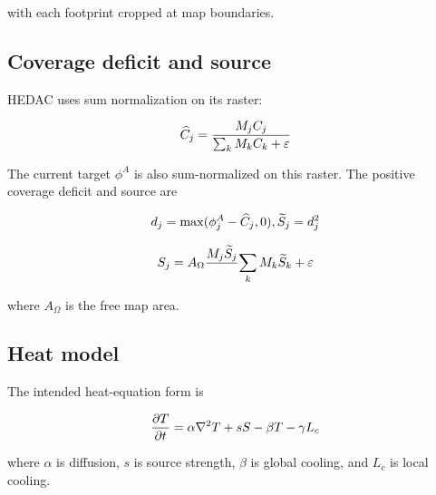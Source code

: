 \documentclass[11pt]{article}
\begin{document}
with each footprint cropped at map boundaries.


\subsection{Coverage deficit and source}


HEDAC uses sum normalization on its raster:


\begin{equation}
\widehat C_j \\
= \\
\frac{M_j C_j}{\sum_kM_kC_k+\varepsilon}
\end{equation}


The current target $\phi^A$ is also sum-normalized on this raster. The positive coverage deficit and source are


\begin{equation}
d_j=\max(\phi^A_j-\widehat C_j,0), \\
\qquad \\
\widetilde S_j=d_j^2
\end{equation}


\begin{equation}
S_j \\
= \\
A_\Omega \\
\frac{M_j\widetilde S_j} \\
{\sum_kM_k\widetilde S_k+\varepsilon}
\end{equation}


where $A_\Omega$ is the free map area.


\subsection{Heat model}


The intended heat-equation form is


\begin{equation}
\frac{\partial T}{\partial t} \\
= \\
\alpha\nabla^2T \\
+ \\
sS \\
- \\
\beta T \\
- \\
\gamma L_c
\end{equation}


where $\alpha$ is diffusion, $s$ is source strength, $\beta$ is global cooling, and $L_c$ is local cooling.
\end{document}
